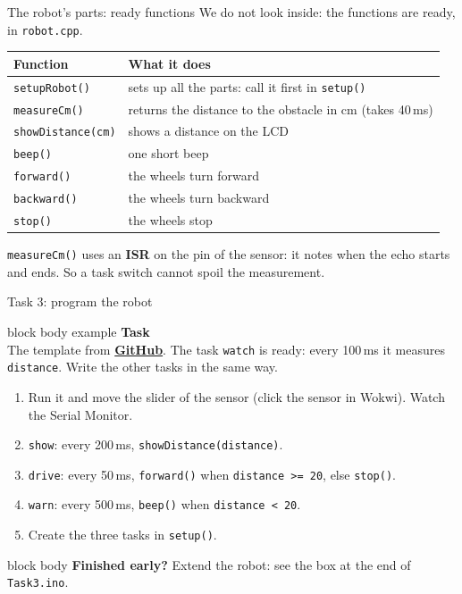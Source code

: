 \documentclass[aspectratio=169,10pt]{beamer}
\newcommand{\taskhead}[2]{%
  \begin{beamercolorbox}[rounded=true,sep=0.12cm,wd=\linewidth]{block body example}
    \small\textbf{#1}\\[0.04cm]
    \footnotesize #2
  \end{beamercolorbox}\vspace{0.1cm}}
\newcommand{\ghlink}[1]{\href{https://github.com/KsaweryM/Computer-Hardware-Course/tree/main/Lecture_6_A_Brief_History_of_Concurrency/#1}{\textcolor{DeepBlue}{\textbf{GitHub}}}}
\begin{document}
\begin{frame}[fragile]{The robot's parts: ready functions}
  We do not look inside: the functions are ready, in \texttt{robot.cpp}.
  \vspace{0.25cm}
  \begin{center}
    \small
    \begin{tabular}{@{}l@{\qquad}l@{}}
      \toprule
      \textbf{Function} & \textbf{What it does} \\
      \midrule
      \texttt{setupRobot()}       & sets up all the parts: call it first in \texttt{setup()} \\
      \texttt{measureCm()}        & returns the distance to the obstacle in cm (takes 40\,ms) \\
      \texttt{showDistance(cm)}   & shows a distance on the LCD \\
      \texttt{beep()}             & one short beep \\
      \texttt{forward()}          & the wheels turn forward \\
      \texttt{backward()}         & the wheels turn backward \\
      \texttt{stop()}             & the wheels stop \\
      \bottomrule
    \end{tabular}
  \end{center}
  \vfill
  {\footnotesize\color{gray}\texttt{measureCm()} uses an \textbf{ISR} on the pin of the sensor: it notes when the
    echo starts and ends. So a task switch cannot spoil the measurement.\par}
\end{frame}

\begin{frame}[fragile]{Task 3: program the robot}
  \taskhead{Task}{The template from \ghlink{Task3}. The task \texttt{watch} is ready: every 100\,ms it
    measures \texttt{distance}. Write the other tasks in the same way.}
  \footnotesize
  \begin{enumerate}\setlength{\itemsep}{3pt}
    \item Run it and move the slider of the sensor (click the sensor in Wokwi). Watch the Serial Monitor.
    \item \texttt{show}: every 200\,ms, \texttt{showDistance(distance)}.
    \item \texttt{drive}: every 50\,ms, \texttt{forward()} when \texttt{distance >= 20}, else \texttt{stop()}.
    \item \texttt{warn}: every 500\,ms, \texttt{beep()} when \texttt{distance < 20}.
    \item Create the three tasks in \texttt{setup()}.
  \end{enumerate}
  \vfill
  \begin{beamercolorbox}[rounded=true,sep=0.1cm,wd=\linewidth]{block body}
    \scriptsize\textbf{Finished early?} Extend the robot: see the box at the end of \texttt{Task3.ino}.
  \end{beamercolorbox}
\end{frame}
\end{document}
